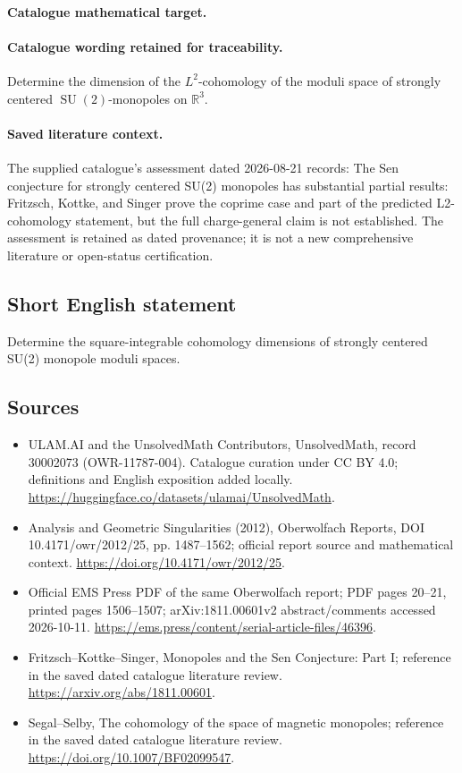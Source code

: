 \documentclass[11pt]{article}
\begin{document}
\paragraph{Catalogue mathematical target.}
\paragraph{Catalogue wording retained for traceability.}
Determine the dimension of the $L^2$-cohomology of the moduli space of strongly centered $\operatorname{SU}(2)$-monopoles on $\mathbb R^3$.

\paragraph{Saved literature context.} The supplied catalogue's assessment dated 2026-08-21 records: The Sen conjecture for strongly centered SU(2) monopoles has substantial partial results: Fritzsch, Kottke, and Singer prove the coprime case and part of the predicted L2-cohomology statement, but the full charge-general claim is not established. The assessment is retained as dated provenance; it is not a new comprehensive literature or open-status certification.
\subsection{Short English statement}
Determine the square-integrable cohomology dimensions of strongly centered SU(2) monopole moduli spaces.
\subsection{Sources}
\begin{itemize}
\item[\hypertarget{source:30002073:1}{S1}] ULAM.AI and the UnsolvedMath Contributors, UnsolvedMath, record 30002073 (OWR-11787-004). Catalogue curation under CC BY 4.0; definitions and English exposition added locally.
\url{https://huggingface.co/datasets/ulamai/UnsolvedMath}.
\item[\hypertarget{source:30002073:2}{S2}] Analysis and Geometric Singularities (2012), Oberwolfach Reports, DOI 10.4171/owr/2012/25, pp. 1487--1562; official report source and mathematical context.
\url{https://doi.org/10.4171/owr/2012/25}.
\item[\hypertarget{source:30002073:3}{S3}] Official EMS Press PDF of the same Oberwolfach report; PDF pages 20--21, printed pages 1506--1507; arXiv:1811.00601v2 abstract/comments accessed 2026-10-11.
\url{https://ems.press/content/serial-article-files/46396}.
\item[\hypertarget{source:30002073:4}{S4}] Fritzsch--Kottke--Singer, Monopoles and the Sen Conjecture: Part I; reference in the saved dated catalogue literature review.
\url{https://arxiv.org/abs/1811.00601}.
\item[\hypertarget{source:30002073:5}{S5}] Segal--Selby, The cohomology of the space of magnetic monopoles; reference in the saved dated catalogue literature review.
\url{https://doi.org/10.1007/BF02099547}.
\end{itemize}
\label{end:30002073}
\end{document}
